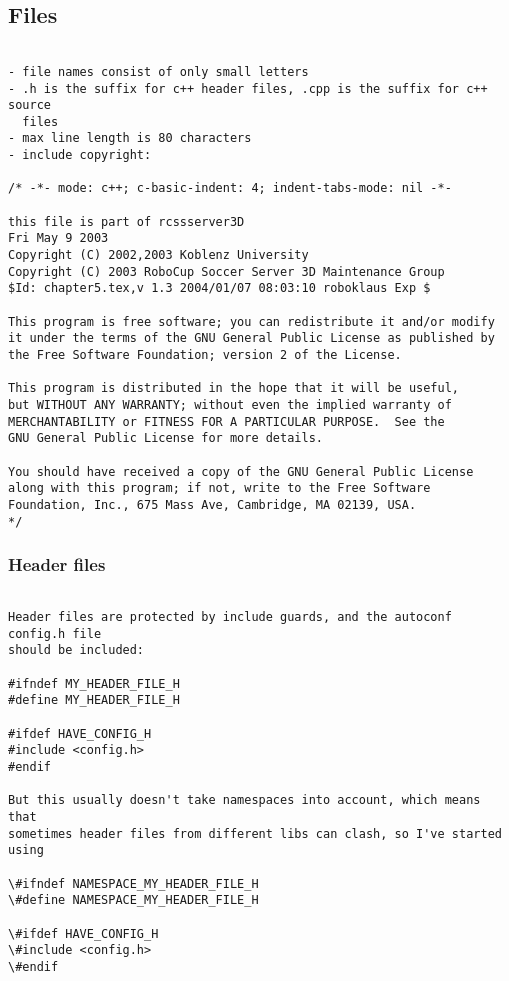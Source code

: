 \subsection{Files}
\begin{verbatim}

- file names consist of only small letters
- .h is the suffix for c++ header files, .cpp is the suffix for c++ source 
  files
- max line length is 80 characters
- include copyright:

/* -*- mode: c++; c-basic-indent: 4; indent-tabs-mode: nil -*-
   
this file is part of rcssserver3D
Fri May 9 2003
Copyright (C) 2002,2003 Koblenz University
Copyright (C) 2003 RoboCup Soccer Server 3D Maintenance Group
$Id: chapter5.tex,v 1.3 2004/01/07 08:03:10 roboklaus Exp $

This program is free software; you can redistribute it and/or modify
it under the terms of the GNU General Public License as published by
the Free Software Foundation; version 2 of the License.
  
This program is distributed in the hope that it will be useful,
but WITHOUT ANY WARRANTY; without even the implied warranty of
MERCHANTABILITY or FITNESS FOR A PARTICULAR PURPOSE.  See the
GNU General Public License for more details.
 
You should have received a copy of the GNU General Public License
along with this program; if not, write to the Free Software
Foundation, Inc., 675 Mass Ave, Cambridge, MA 02139, USA.
*/

\end{verbatim}
\subsubsection{Header files}
\begin{verbatim}

Header files are protected by include guards, and the autoconf config.h file
should be included:

#ifndef MY_HEADER_FILE_H
#define MY_HEADER_FILE_H

#ifdef HAVE_CONFIG_H
#include <config.h>
#endif

But this usually doesn't take namespaces into account, which means that 
sometimes header files from different libs can clash, so I've started using

\#ifndef NAMESPACE_MY_HEADER_FILE_H
\#define NAMESPACE_MY_HEADER_FILE_H

\#ifdef HAVE_CONFIG_H
\#include <config.h>
\#endif

\end{verbatim}

